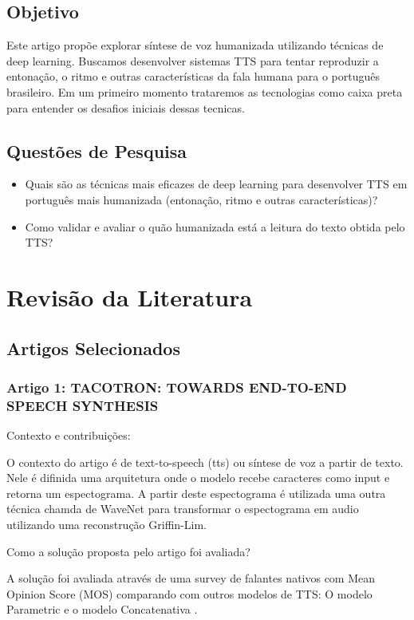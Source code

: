 \documentclass[a4paper,12pt]{article}
\begin{document}
		\subsection{Objetivo}
		Este artigo propõe explorar síntese de voz humanizada utilizando técnicas de deep learning. Buscamos desenvolver sistemas TTS para tentar reproduzir a entonação, o ritmo e outras características da fala humana para o português brasileiro. Em um primeiro momento trataremos as tecnologias como caixa preta para entender os desafios iniciais dessas tecnicas.

		\subsection{Questões de Pesquisa}
		\begin{itemize}
			\item Quais são as técnicas mais eficazes de deep learning para desenvolver TTS em português mais humanizada (entonação, ritmo e outras características)?
			\item Como validar e avaliar o quão humanizada está a leitura do texto obtida pelo TTS?
		\end{itemize}
	\section{Revisão da Literatura}
		\subsection{Artigos Selecionados}
			\subsubsection{Artigo 1: TACOTRON: TOWARDS END-TO-END SPEECH SYNTHESIS}
			
			Contexto e contribuições:
						
			O contexto do artigo é de text-to-speech (tts) ou síntese de voz a partir de texto. Nele é difinida uma arquitetura onde o modelo recebe caracteres como input e retorna um espectograma. A partir deste espectograma é utilizada uma outra técnica chamda de WaveNet \cite{oord2016wavenet} para transformar o espectograma em audio utilizando uma reconstrução Griffin-Lim.
			
			Como a solução proposta pelo artigo foi avaliada?
			
			A solução foi avaliada através de uma survey de falantes nativos com Mean Opinion Score (MOS) comparando com outros modelos de TTS: O modelo Parametric \cite{zen2016parametric} e o modelo Concatenativa \cite{goncalvo2016concatenative}.
			
\end{document}
